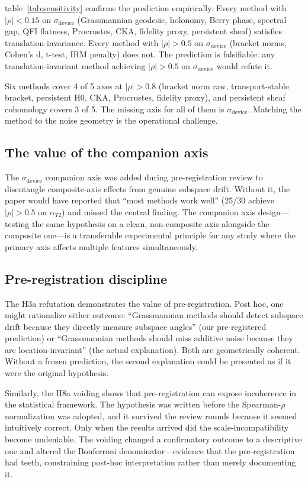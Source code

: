 \documentclass[11pt]{article}
\begin{document}
table~\ref{tab:sensitivity} confirms the prediction empirically.  Every
method with $|\rho| < 0.15$ on $\sigma_\text{device}$ (Grassmannian
geodesic, holonomy, Berry phase, spectral gap, QFI flatness, Procrustes,
CKA, fidelity proxy, persistent sheaf) satisfies
translation-invariance.  Every method with $|\rho| > 0.5$ on
$\sigma_\text{device}$ (bracket norms, Cohen's d, t-test, IRM
penalty) does not.  The prediction is falsifiable: any
translation-invariant method achieving $|\rho| > 0.5$ on
$\sigma_\text{device}$ would refute it.

Six methods cover 4 of 5 axes at $|\rho| > 0.8$ (bracket norm raw,
transport-stable bracket, persistent H0, CKA, Procrustes, fidelity
proxy), and persistent sheaf cohomology covers 3 of 5.  The missing
axis for all of them is $\sigma_\text{device}$.  Matching the method
to the noise geometry is the operational challenge.

\subsection{The value of the companion axis}

The $\sigma_\text{device}$ companion axis was added during
pre-registration review to disentangle composite-axis effects from
genuine subspace drift.  Without it, the paper would have reported that
``most methods work well'' (25/30 achieve $|\rho| > 0.5$ on
$\alpha_{T2}$) and missed the central finding.  The companion axis design---testing the same
hypothesis on a clean, non-composite axis alongside the composite
one---is a transferable experimental principle for any study where the
primary axis affects multiple features simultaneously.

\subsection{Pre-registration discipline}

The H3a refutation demonstrates the value of pre-registration.  Post
hoc, one might rationalize either outcome: ``Grassmannian methods should
detect subspace drift because they directly measure subspace angles''
(our pre-registered prediction) or ``Grassmannian methods should miss
additive noise because they are location-invariant'' (the actual
explanation).  Both are geometrically coherent.  Without a frozen
prediction, the second explanation could be presented as if it were
the original hypothesis.

Similarly, the H8a voiding shows that pre-registration can expose
incoherence in the statistical framework.  The hypothesis was written
before the Spearman-$\rho$ normalization was adopted, and it survived
the review rounds because it seemed intuitively correct.  Only when the
results arrived did the scale-incompatibility become undeniable.  The
voiding changed a confirmatory outcome to a descriptive one and altered
the Bonferroni denominator---evidence that the pre-registration had
teeth, constraining post-hoc interpretation rather than merely
documenting it.
\end{document}
